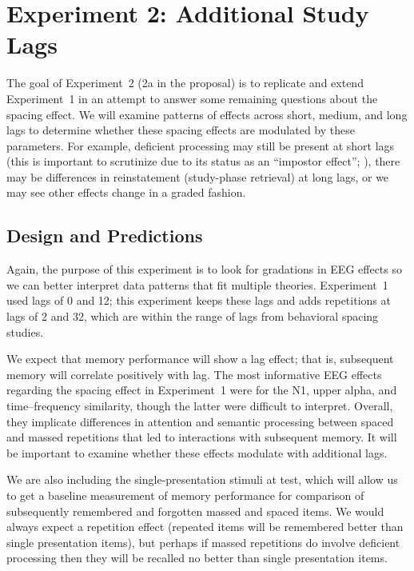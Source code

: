 
\section{Experiment 2: Additional Study Lags}

The goal of Experiment~2 (2a in the proposal) is to replicate and extend Experiment~1 in an attempt to answer some remaining questions about the spacing effect.  We will examine patterns of effects across short, medium, and long lags to determine whether these spacing effects are modulated by these parameters.  For example, deficient processing may still be present at short lags (this is important to scrutinize due to its status as an ``impostor effect''; ), there may be differences in reinstatement (study-phase retrieval) at long lags, or we may see other effects change in a graded fashion.

\subsection{Design and Predictions}

Again, the purpose of this experiment is to look for gradations in EEG effects so we can better interpret data patterns that fit multiple theories.  Experiment~1 used lags of 0 and 12; this experiment keeps these lags and adds repetitions at lags of 2 and 32, which are within the range of lags from behavioral spacing studies.

We expect that memory performance will show a lag effect; that is, subsequent memory will correlate positively with lag.  The most informative EEG effects regarding the spacing effect in Experiment~1 were for the N1, upper alpha, and time--frequency similarity, though the latter were difficult to interpret.  Overall, they implicate differences in attention and semantic processing between spaced and massed repetitions that led to interactions with subsequent memory.  It will be important to examine whether these effects modulate with additional lags.

We are also including the single-presentation stimuli at test, which will allow us to get a baseline measurement of memory performance for comparison of subsequently remembered and forgotten massed and spaced items.  We would always expect a repetition effect (repeated items will be remembered better than single presentation items), but perhaps if massed repetitions do involve deficient processing then they will be recalled no better than single presentation items.

